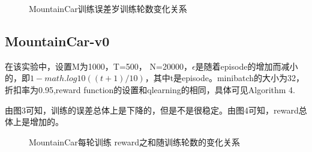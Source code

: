 \documentclass[a4paper,UTF8]{article}
\theoremstyle{definition}
\begin{document}
\begin{figure}[htb]
    \caption{\label{mountainCar:1} MountainCar训练误差岁训练轮数变化关系}
    \end{figure}

\subsection*{MountainCar-v0}	
在该实验中，设置M为1000，T=500， N=20000，$\epsilon$是随着episode的增加而减小的，即$1-math.log10((t+1)/10)$，其中t是episode。minibatch的大小为32，折扣率为0.95,reward function的设置和qlearning的相同，具体可见Algorithm 4.

由图3可知，训练的误差总体上是下降的，但是不是很稳定。由图4可知，reward总体上是增加的。

\begin{figure}[htb]
    \caption{\label{mountainCar:2} MountainCar每轮训练 reward之和随训练轮数的变化关系}
    \end{figure}
\end{document}
